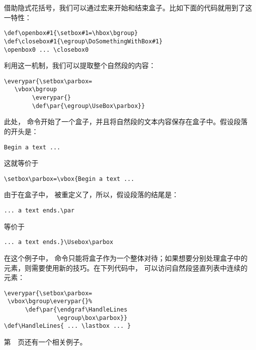 \documentclass{book}
\begin{document}
借助隐式花括号，我们可以通过宏来开始和结束盒子。比如下面的代码就用到了这一特性：
\begin{verbatim}
\def\openbox#1{\setbox#1=\hbox\bgroup}
\def\closebox#1{\egroup\DoSomethingWithBox#1}
\openbox0 ... \closebox0
\end{verbatim}
利用这一机制，我们可以提取整个自然段的内容：
\begin{verbatim}
\everypar{\setbox\parbox=
   \vbox\bgroup
        \everypar{}
        \def\par{\egroup\UseBox\parbox}}
\end{verbatim}
此处， 命令开始了一个盒子，并且将自然段的文本内容保存在盒子中。假设段落的开头是：
\begin{verbatim}
Begin a text ...
\end{verbatim}
这就等价于
\begin{verbatim}
\setbox\parbox=\vbox{Begin a text ...
\end{verbatim}
由于在盒子中， 被重定义了，所以，假设段落的结尾是：
\begin{verbatim}
... a text ends.\par
\end{verbatim}
等价于
\begin{verbatim}
... a text ends.}\Usebox\parbox
\end{verbatim}

在这个例子中， 命令只能将盒子作为一个整体对待；如果想要分别处理盒子中的元素，则需要使用新的技巧。在下列代码中， 可以访问自然段竖直列表中连续的元素：
\begin{verbatim}
\everypar{\setbox\parbox=
 \vbox\bgroup\everypar{}%
      \def\par{\endgraf\HandleLines
               \egroup\box\parbox}}
\def\HandleLines{ ... \lastbox ... }
\end{verbatim}
第~\pageref{varioset}~页还有一个相关例子。
\end{document}
